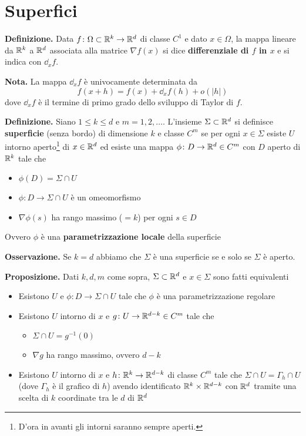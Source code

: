 \section{Superfici}

\textbf{Definizione.} Data $f \colon \Omega \subset \mathbb R^k \to \mathbb R^d$ di classe $C^1$ e dato $x \in \Omega$, la mappa lineare da $\mathbb R^k$ a $\mathbb R^d$ associata alla matrice $\nabla f(x)$ si dice \textbf{differenziale di $f$ in $x$} e si indica con $\dd_x f$.

\textbf{Nota.} La mappa $\dd_x f$ è univocamente determinata  da
%
$$
	f(x+h) = f(x) + \dd_x f(h) + o(|h|)
$$
%
dove $\dd_x f$ è il termine di primo grado dello sviluppo di Taylor di $f$.

\textbf{Definizione.} Siano $1 \leq k \leq d$ e $m = 1,2,\ldots$. L'insieme $\Sigma \subset \mathbb R^d$ si definisce \textbf{superficie} (senza bordo) di dimensione $k$ e classe $C^m$ se per ogni $x \in \Sigma$ esiste $U$ intorno aperto\footnote{D'ora in avanti gli intorni saranno sempre aperti.} di $x \in \mathbb R^d$ ed esiste una mappa $\phi \colon D \to \mathbb R^d \in C^m$ con $D$ aperto di $\mathbb R^k$ tale che
\begin{itemize}

	\item $\phi(D) = \Sigma \cap U$

	\item $\phi \colon D \to \Sigma \cap U$ è un omeomorfismo

	\item $\nabla \phi(s)$ ha rango massimo ($=k$) per ogni $s \in D$

\end{itemize}
Ovvero $\phi$ è una \textbf{parametrizzazione locale} della superficie

\textbf{Osservazione.} Se $k = d$ abbiamo che $\Sigma$ è una superficie se e solo se $\Sigma$ è aperto.

\textbf{Proposizione.} Dati $k,d,m$ come sopra, $\Sigma \subset \mathbb R^d$ e $x \in \Sigma$ sono fatti equivalenti
\begin{itemize}

	\item Esistono $U$ e $\phi \colon D \to \Sigma \cap U$ tale che $\phi$ è una parametrizzazione regolare


	\item Esistono $U$ intorno di $x$ e $g \colon U \to \mathbb R^{d-k} \in C^m$ tale che 
	\begin{itemize}

		\item $\Sigma \cap U = g^{-1}(0)$

		\item $\nabla g$ ha rango massimo, ovvero $d-k$ 

	\end{itemize}


	\item Esistono $U$ intorno di $x$ e $h \colon \mathbb R^k \to \mathbb R^{d-k}$ di classe $C^m$ tale che $\Sigma \cap U = \Gamma_h \cap U$ (dove $\Gamma_h$ è il grafico di $h$) avendo identificato $\mathbb R^k \times \mathbb R^{d-k}$ con $\mathbb R^d$ tramite una scelta di $k$ coordinate tra le $d$ di $\mathbb R^d$

\end{itemize}

